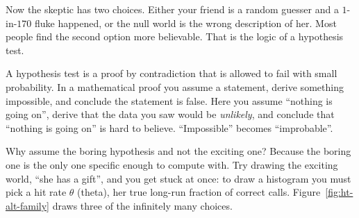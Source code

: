 Now the skeptic has two choices. Either your friend is a random guesser and
a $1$-in-$170$ fluke happened, or the null world is the wrong description of
her. Most people find the second option more believable. That is the logic of
a hypothesis test.

\begin{intuitionbox}
A hypothesis test is a proof by contradiction that is allowed to fail with small
probability. In a mathematical proof you assume a statement, derive something
impossible, and conclude the statement is false. Here you assume ``nothing is going
on'', derive that the data you saw would be \emph{unlikely}, and conclude that
``nothing is going on'' is hard to believe. ``Impossible'' becomes ``improbable''.
\end{intuitionbox}

Why assume the boring hypothesis and not the exciting one? Because the boring one is
the only one specific enough to compute with. Try drawing the exciting world, ``she
has a gift'', and you get stuck at once: to draw a histogram you must pick a hit rate $\theta$ (theta), her
true long-run fraction of correct calls.
Figure~\ref{fig:ht-alt-family} draws three of the infinitely many choices.

